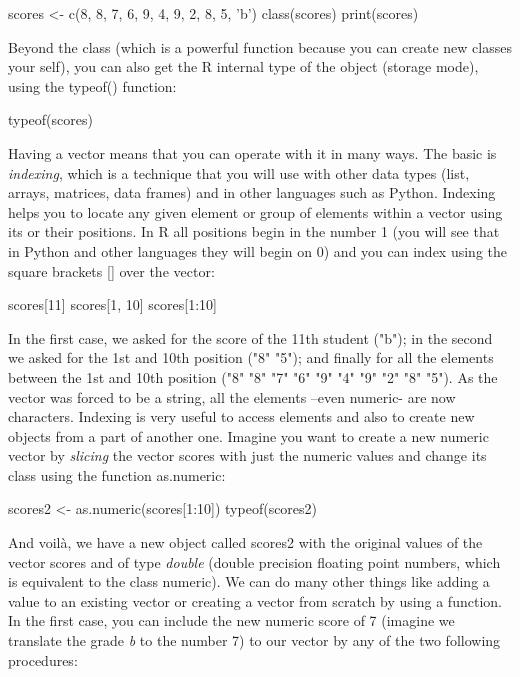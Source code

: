 \begin{exampler}
scores <- c(8, 8, 7, 6, 9, 4, 9, 2, 8, 5,  'b')
class(scores)
print(scores)
\end{exampler}

Beyond the class (which is a powerful function because you can create new classes your self), you can also get the R internal type of the object (storage mode), using the typeof() function:

\begin{exampler}
typeof(scores)
\end{exampler}

Having a vector means that you can operate with it in many ways. The basic is \emph{indexing}, which is a technique that you will use with other data types (list, arrays, matrices, data frames) and in other languages such as Python.  Indexing helps you to locate any given element or group of elements within a vector using its or their positions. In R all positions begin in the number 1 (you will see that in Python and other languages they will begin on 0) and you can index using the square brackets [] over the vector:

\begin{exampler}
scores[11]
scores[1, 10]
scores[1:10]
\end{exampler}

In the first case, we asked for the score of the 11th student ("b"); in the second we asked for the 1st and 10th position ("8"  "5"); and finally for all the elements between the 1st and 10th position ("8" "8" "7" "6" "9" "4" "9" "2" "8" "5"). As the vector was forced to be a string, all the elements –even numeric- are now characters. Indexing is very useful to access elements and also to create new objects from a part of another one. Imagine you want to create a new numeric vector by \emph{slicing} the vector scores with just the numeric values and change its class using the function as.numeric:

\begin{exampler}
scores2 <- as.numeric(scores[1:10])
typeof(scores2)
\end{exampler}

And voilà, we have a new object called scores2 with the original values of the vector scores and of type \emph{double} (double precision floating point numbers, which is equivalent to the class numeric).  We can do many other things like adding a value to an existing vector or creating a vector from scratch by using a function. In the first case, you can include the new numeric score of 7 (imagine we translate the grade \emph{b} to the number 7) to our vector by any of the two following procedures:

